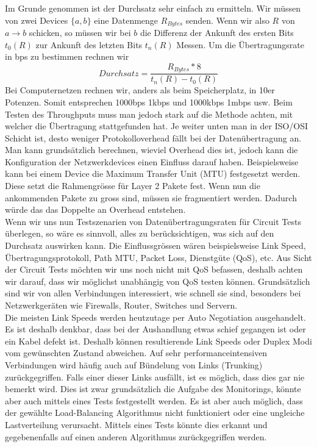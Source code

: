 \documentclass[a4,12pt]{scrartcl}
\begin{document}
\noindent Im Grunde genommen ist der Durchsatz sehr einfach zu ermitteln. Wir müssen von zwei Devices $\{a,b\}$ eine Datenmenge $R_{Bytes}$ senden. Wenn wir also $R$ von $a \rightarrow b$ schicken, so müssen wir bei $b$ die Differenz der Ankunft des ersten Bits $t_0(R)$ zur Ankunft des letzten Bits $t_n(R)$ Messen. Um die Übertragungsrate in bps zu bestimmen rechnen wir
\begin{equation}
Durchsatz = \frac{R_{Bytes} * 8}{t_n(R) - t_0(R)}  
\end{equation} 
Bei Computernetzen rechnen wir, anders als beim Speicherplatz, in 10er Potenzen. Somit entsprechen 1000bps 1kbps und 1000kbps 1mbps usw. Beim Testen des Throughputs muss man jedoch stark auf die Methode achten, mit welcher die Übertragung stattgefunden hat. Je weiter unten man in der ISO/OSI Schicht ist, desto weniger Protokolloverhead fällt bei der Datenübertragung an. Man kann grundsätzlich berechnen, wieviel Overhead dies ist, jedoch kann die Konfiguration der Netzwerkdevices einen Einfluss darauf haben. Beispielsweise kann bei einem Device die Maximum Transfer Unit (MTU) festgesetzt werden. Diese setzt die Rahmengrösse für Layer 2 Pakete fest. Wenn nun die ankommenden Pakete zu gross sind, müssen sie fragmentiert werden. Dadurch würde das das Doppelte an Overhead entstehen.\\

\noindent Wenn wir uns nun Testszenarien von Datenübertragungsraten für Circuit Tests überlegen, so wäre es sinnvoll, alles zu berücksichtigen, was sich auf den Durchsatz auswirken kann. Die Einflussgrössen wären beispielsweise Link Speed, Übertragungsprotokoll, Path MTU, Packet Loss, Dienstgüte (QoS), etc. Aus Sicht der Circuit Tests möchten wir uns noch nicht mit QoS befassen, deshalb achten wir darauf, dass wir möglichst unabhängig von QoS testen können. Grundsätzlich sind wir von allen Verbindungen interessiert, wie schnell sie sind, besonders bei Netzwerkgeräten wie Firewalls, Router, Switches und Servern.\\

\noindent Die meisten Link Speeds werden heutzutage per Auto Negotiation ausgehandelt. Es ist deshalb denkbar, dass bei der Aushandlung etwas schief gegangen ist oder ein Kabel defekt ist. Deshalb können resultierende Link Speeds oder Duplex Modi vom gewünschten Zustand abweichen. Auf sehr performanceintensiven Verbindungen wird häufig auch auf Bündelung von Links (Trunking) zurückgegriffen. Falls einer dieser Links ausfällt, ist es möglich, dass dies gar nie bemerkt wird. Dies ist zwar grundsätzlich die Aufgabe des Monitorings, könnte aber auch mittels eines Tests festgestellt werden. Es ist aber auch möglich, dass der gewählte Load-Balancing Algorithmus nicht funktioniert oder eine ungleiche Lastverteilung verursacht. Mittels eines Tests könnte dies erkannt und gegebenenfalls auf einen anderen Algorithmus zurückgegriffen werden.\\
\end{document}
